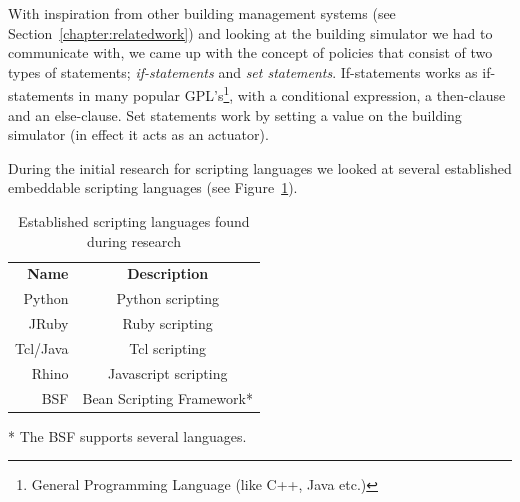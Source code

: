 With inspiration from other building management systems (see Section~\ref{chapter:relatedwork}) and looking at the building simulator we had to communicate with, we came up with the concept of policies that consist of two types of statements; \textit{if-statements} and \textit{set statements}. If-statements works as if-statements in many popular GPL's\footnote{General Programming Language (like C++, Java etc.)}, with a conditional expression, a then-clause and an else-clause. Set statements work by setting a value on the building simulator (in effect it acts as an actuator).

During the initial research for scripting languages we looked at several established embeddable scripting languages (see Figure~\ref{tbl:design-scripting-languages}).

\begin{table}[h]
	\center
	\begin{tabular}{rc}
		\textbf{Name}	&	\textbf{Description}\\
		Python	&	Python scripting\\
		JRuby	&	Ruby scripting\\
		Tcl/Java	&	Tcl scripting\\
		Rhino	&	Javascript scripting\\
		BSF		&	Bean Scripting Framework*
	\end{tabular}
	\caption{Established scripting languages found during research}\label{tbl:design-scripting-languages}
\end{table}

* The BSF supports several languages.


